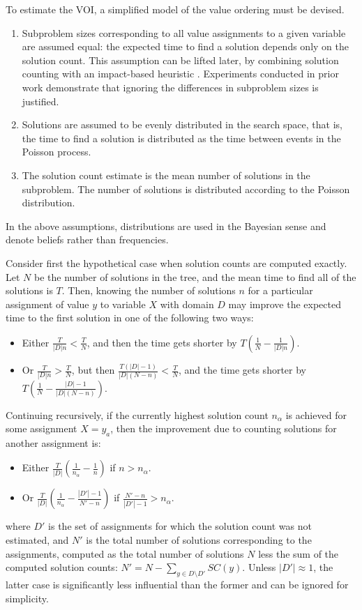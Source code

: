 To estimate the VOI, a simplified model of the value ordering must be
devised.
\begin{enumerate}
\item Subproblem sizes corresponding to all value assignments to a
   given variable are assumed equal: the expected time to find a solution
   depends only on the solution count. This assumption can be lifted
   later, by combining solution counting with an impact-based
   heuristic \cite{Refalo.impact}. Experiments conducted in prior work
   \cite{Meisels.solcount}\cite{Kask.solcount} demonstrate that
   ignoring the differences in subproblem sizes is justified.
\item Solutions are assumed to be evenly distributed in the search
  space, that is, the time to find a solution is distributed as the
  time between events in the Poisson process.
\item The solution count estimate is the mean number of solutions
  in the subproblem. The number of solutions is distributed according
  to the Poisson distribution.
\end{enumerate}
In the above assumptions, distributions are used in the Bayesian
sense and denote beliefs rather than frequencies. 

Consider first the hypothetical case when solution counts are computed
exactly. Let $N$ be the number of solutions in the tree, and the mean
time to find all of the solutions is $T$. Then, knowing the number of
solutions $n$ for a particular assignment of value $y$ to variable $X$
with domain $D$ may improve the expected time to the first solution in
one of the following two ways:
\begin{itemize}
\item Either $\frac T {|D|n} < \frac T N$, and then the time gets shorter by $T \left( \frac 1 N - \frac 1 {|D|n}\right)$. 
\item Or $\frac T {|D|n} > \frac T N$, but then $\frac {T(|D|-1)} {|D|(N-n)} < \frac T N$, and the time gets shorter by $T \left( \frac 1 N - \frac {|D|-1} {|D|(N-n)}\right)$.
\end{itemize}

Continuing recursively, if the currently highest solution count
$n_\alpha$ is achieved for some assignment $X=y_a$, then the
improvement due to counting solutions for another assignment is:
\begin{itemize}
\item Either $\frac T {|D|} \left( \frac 1 {n_\alpha} - \frac 1 n\right)$ if $n > n_\alpha$.
\item Or $\frac T {|D|} \left (\frac 1 {n_\alpha} - \frac {|D'|-1} {N'-n} \right)$ if $\frac {N'-n} {|D'|-1} > n_\alpha$.
\end{itemize}
where $D'$ is the set of assignments for which the solution count was
not estimated, and $N'$ is the total number of solutions corresponding
to the assignments, computed as the total number of solutions $N$ less
the sum of the computed solution counts: $N'=N-\sum_{y \in D\setminus D'} SC(y)$.
Unless $|D'|\approx 1$, the latter case is significantly less
influential than the former and can be ignored for simplicity.

